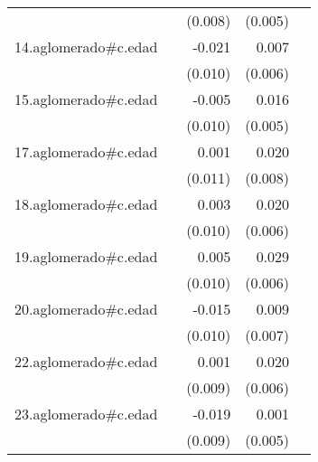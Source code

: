 {\begin{longtable}{l*{4}{D{.}{.}{-1}}}
            &                     &     (0.008)         &     (0.005)         &                     \\
\addlinespace
14.aglomerado#c.edad&                     &      -0.021\sym{*}  &       0.007         &                     \\
            &                     &     (0.010)         &     (0.006)         &                     \\
\addlinespace
15.aglomerado#c.edad&                     &      -0.005         &       0.016\sym{**} &                     \\
            &                     &     (0.010)         &     (0.005)         &                     \\
\addlinespace
17.aglomerado#c.edad&                     &       0.001         &       0.020\sym{*}  &                     \\
            &                     &     (0.011)         &     (0.008)         &                     \\
\addlinespace
18.aglomerado#c.edad&                     &       0.003         &       0.020\sym{**} &                     \\
            &                     &     (0.010)         &     (0.006)         &                     \\
\addlinespace
19.aglomerado#c.edad&                     &       0.005         &       0.029\sym{***}&                     \\
            &                     &     (0.010)         &     (0.006)         &                     \\
\addlinespace
20.aglomerado#c.edad&                     &      -0.015         &       0.009         &                     \\
            &                     &     (0.010)         &     (0.007)         &                     \\
\addlinespace
22.aglomerado#c.edad&                     &       0.001         &       0.020\sym{***}&                     \\
            &                     &     (0.009)         &     (0.006)         &                     \\
\addlinespace
23.aglomerado#c.edad&                     &      -0.019\sym{*}  &       0.001         &                     \\
            &                     &     (0.009)         &     (0.005)         &                     \\

\end{longtable}}
